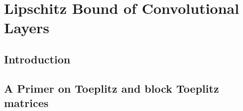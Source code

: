 \chapter{Lipschitz Bound of Convolutional Layers}
\label{chapter:lipschitz_bound}
\localtableofcontents



\section{Introduction}
\label{section:ch5-introduction}

\section{A Primer on Toeplitz and block Toeplitz matrices}
\label{section:primer_toeplitz_matrix}

